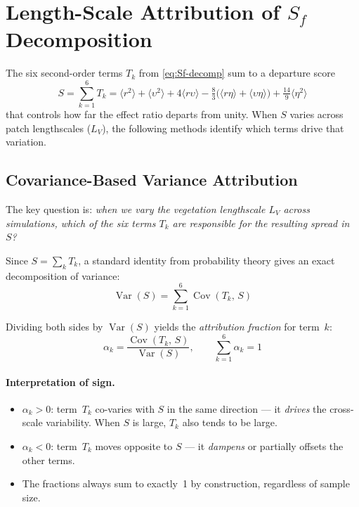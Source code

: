 \documentclass[11pt]{article}
\newcommand{\avg}[1]{\langle #1 \rangle}
\newcommand{\Sf}{S_f}
\begin{document}
\section{Length-Scale Attribution of $\Sf$ Decomposition}

The six second-order terms $T_k$ from \eqref{eq:Sf-decomp} sum to a
departure score
\begin{equation}\label{eq:S-sum}
  S = \sum_{k=1}^{6} T_k
  = \avg{r^2} + \avg{\upsilon^2} + 4\avg{r\upsilon}
    - \tfrac{8}{3}\bigl(\avg{r\eta} + \avg{\upsilon\eta}\bigr)
    + \tfrac{14}{9}\avg{\eta^2}
\end{equation}
that controls how far the effect ratio departs from unity.
When $S$ varies across patch lengthscales ($L_V$), the following
methods identify which terms drive that variation.

\subsection{Covariance-Based Variance Attribution}

The key question is: \emph{when we vary the vegetation lengthscale
$L_V$ across simulations, which of the six terms $T_k$ are
responsible for the resulting spread in~$S$?}

Since $S = \sum_k T_k$, a standard identity from probability theory
gives an exact decomposition of variance:
\begin{equation}\label{eq:var-decomp}
  \operatorname{Var}(S)
  = \sum_{k=1}^{6} \operatorname{Cov}(T_k,\, S)
\end{equation}

Dividing both sides by $\operatorname{Var}(S)$ yields the
\emph{attribution fraction} for term~$k$:
\begin{equation}\label{eq:attrib-frac}
  \alpha_k
  = \frac{\operatorname{Cov}(T_k,\, S)}{\operatorname{Var}(S)},
  \qquad \sum_{k=1}^{6}\alpha_k = 1
\end{equation}

\paragraph{Interpretation of sign.}
\begin{itemize}
  \item $\alpha_k > 0$: term~$T_k$ co-varies with $S$ in the same
    direction --- it \emph{drives} the cross-scale variability.
    When $S$ is large, $T_k$ also tends to be large.
  \item $\alpha_k < 0$: term~$T_k$ moves opposite to $S$ ---
    it \emph{dampens} or partially offsets the other terms.
  \item The fractions always sum to exactly~1 by construction,
    regardless of sample size.
\end{itemize}
\end{document}
